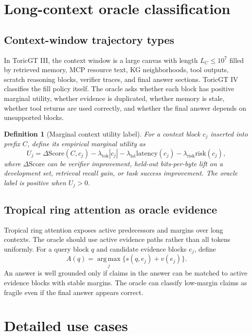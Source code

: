 \documentclass[11pt]{article}
\newtheorem{definition}[theorem]{Definition}
\newcommand{\argmax}{\operatorname*{arg\,max}}
\numberwithin{equation}{section}
\begin{document}
\section{Long-context oracle classification}
\subsection{Context-window trajectory types}
In ToricGT III, the context window is a large canvas with length $L_C\le 10^7$ filled by retrieved memory, MCP resource text, KG neighborhoods, tool outputs, scratch reasoning blocks, verifier traces, and final answer sections. ToricGT IV classifies the fill policy itself. The oracle asks whether each block has positive marginal utility, whether evidence is duplicated, whether memory is stale, whether tool returns are used correctly, and whether the final answer depends on unsupported blocks.

\begin{definition}[Marginal context utility label]
For a context block $c_j$ inserted into prefix $C$, define its empirical marginal utility as
\begin{equation}
U_j=\Delta \mathrm{Score}(C,c_j)-\lambda_{\mathrm{tok}}|c_j|-\lambda_{\mathrm{lat}}\mathrm{latency}(c_j)-\lambda_{\mathrm{risk}}\mathrm{risk}(c_j),
\end{equation}
where $\Delta\mathrm{Score}$ can be verifier improvement, held-out bits-per-byte lift on a development set, retrieval recall gain, or task success improvement. The oracle label is positive when $U_j>0$.
\end{definition}

\subsection{Tropical ring attention as oracle evidence}
Tropical ring attention exposes active predecessors and margins over long contexts. The oracle should use active evidence paths rather than all tokens uniformly. For a query block $q$ and candidate evidence blocks $e_j$, define
\begin{equation}
A(q)=\argmax_j \{s(q,e_j)+v(e_j)\}.
\end{equation}
An answer is well grounded only if claims in the answer can be matched to active evidence blocks with stable margins. The oracle can classify low-margin claims as fragile even if the final answer appears correct.

\section{Detailed use cases}
\end{document}

